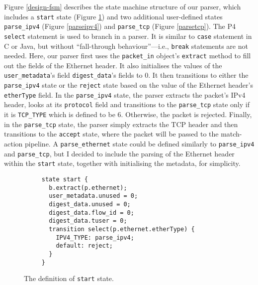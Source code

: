 Figure \ref{design-fsm} describes the state machine structure of our parser, which includes a \texttt{start} state (Figure \ref{start}) and two additional user-defined states \texttt{parse\_ipv4} (Figure \ref{parseipv4}) and \texttt{parse\_tcp} (Figure \ref{parsetcp}). The P4 \texttt{select} statement is used to branch in a parser. It is similar to \texttt{case} statement in C or Java, but without ``fall-through behaviour''---i.e., \texttt{break} statements are not needed. Here, our parser first uses the \verb|packet_in| object's \texttt{extract} method to fill out the fields of the Ethernet header. It also initialises the values of the \verb|user_metadata|'s field \verb|digest_data|'s fields to 0. It then transitions to either the \verb|parse_ipv4| state or the \texttt{reject} state based on the value of the Ethernet header’s \texttt{etherType} field. In the \texttt{parse\_ipv4} state, the parser extracts the packet's IPv4 header, looks at its \texttt{protocol} field and transitions to the \texttt{parse\_tcp} state only if it is \texttt{TCP\_TYPE} which is defined to be 6. Otherwise, the packet is rejected. Finally, in the \texttt{parse\_tcp} state, the parser simply extracts the TCP header and then transitions to the \texttt{accept} state, where the packet will be passed to the match-action pipeline. A \texttt{parse\_ethernet} state could be defined similarly to \verb|parse_ipv4| and \verb|parse_tcp|, but I decided to include the parsing of the Ethernet header within the \texttt{start} state, together with initialising the metadata, for simplicity.

\begin{figure}[!h]
	{\renewcommand{\baselinestretch}{0.8}\small
		\begin{verbatim}
     state start {
       b.extract(p.ethernet);
       user_metadata.unused = 0;
       digest_data.unused = 0;
       digest_data.flow_id = 0;
       digest_data.tuser = 0;
       transition select(p.ethernet.etherType) {
         IPV4_TYPE: parse_ipv4;
         default: reject;
       } 
     }
		\end{verbatim}
	}
\caption{The definition of \texttt{start} state.}
\label{start}
\end{figure}

